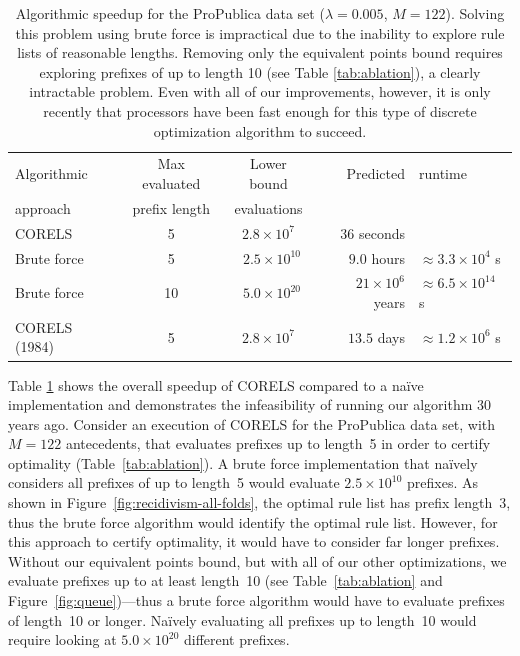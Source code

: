 \documentclass[twoside,11pt]{article}
\def\Reg{{\lambda}}
\begin{document}
\begin{table}[t!]
\centering
\begin{tabular}{l|c|c|r l}
Algorithmic & Max evaluated & Lower bound & Predicted&runtime \\
approach & prefix length & evaluations & \\
\hline
CORELS & 5  & $ 2.8 \times 10^7$ & $36$ seconds& \\
Brute force & 5 & ~$2.5 \times 10^{10}$ & $9.0$ hours&$\approx 3.3 \times 10^4$ s \\
Brute force & 10 & ~$5.0 \times 10^{20}$ & $21 \times 10^6$ years&$\approx 6.5 \times 10^{14}$ s \\
CORELS (1984) & 5 & $2.8 \times 10^7$ & $13.5$ days&$\approx 1.2 \times 10^6$ s \\
\end{tabular}
\caption{Algorithmic speedup for the ProPublica data set (${\Reg = 0.005}$, ${M = 122}$).
%
Solving this problem using brute force is impractical due to the inability to explore rule lists of reasonable lengths.
%
Removing only the equivalent points bound requires exploring prefixes of up to length 10 (see Table \ref{tab:ablation}), a clearly intractable problem.
%
Even with all of our improvements, however, it is only recently that processors have been fast enough for this type of discrete optimization algorithm to succeed.
}
\label{tab:speedup}
\end{table}

Table \ref{tab:speedup} shows the overall speedup of CORELS compared to a na\"ive implementation
and demonstrates the infeasibility of running our algorithm 30 years ago.
%
Consider an execution of CORELS for the ProPublica data set, with ${M = 122}$ antecedents,
that evaluates prefixes up to length~5 in order to certify optimality (Table~\ref{tab:ablation}).
%
A brute force implementation that na\"ively considers all prefixes of up to length~5
would evaluate ${2.5 \times 10^{10}}$ prefixes.
%
As shown in Figure~\ref{fig:recidivism-all-folds}, the optimal rule list has prefix length~3,
thus the brute force algorithm would identify the optimal rule list.
%
However, for this approach to certify optimality, it would have to consider far longer prefixes.
%
Without our equivalent points bound, but with all of our other optimizations,
we evaluate prefixes up to at least length~10
(see Table~\ref{tab:ablation} and Figure~\ref{fig:queue})---thus a brute force algorithm
would have to evaluate prefixes of length~10 or longer.
%
Na\"ively evaluating all prefixes up to length~10 would require looking at ${5.0 \times 10^{20}}$ different prefixes.
\end{document}
